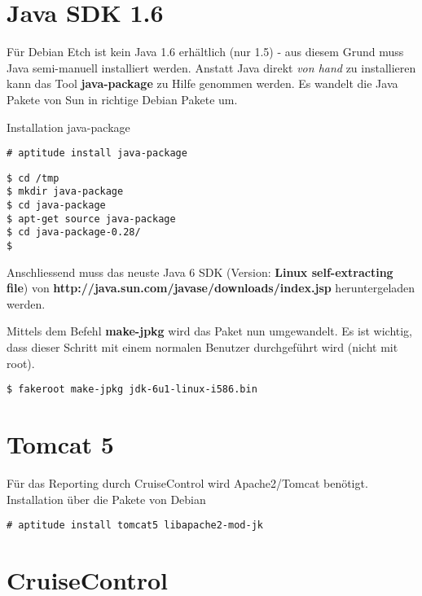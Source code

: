 \documentclass[a4paper,12pt,halfparskip,DIV14]{scrreprt}
\begin{document}

\section{Java SDK 1.6} %
\label{sec:java_sdk}

Für Debian Etch ist kein Java 1.6 erhältlich (nur 1.5) - aus diesem Grund muss Java semi-manuell installiert werden. Anstatt Java direkt \emph{von hand} zu installieren kann das Tool \textbf{java-package} zu Hilfe genommen werden. Es wandelt die Java Pakete von Sun in richtige Debian Pakete um. 

Installation java-package

\begin{verbatim}
# aptitude install java-package  
\end{verbatim}

\begin{verbatim}
$ cd /tmp
$ mkdir java-package
$ cd java-package
$ apt-get source java-package
$ cd java-package-0.28/
$
\end{verbatim}

Anschliessend muss das neuste Java 6 SDK (Version: \textbf{Linux self-extracting file}) von \textbf{http://java.sun.com/javase/downloads/index.jsp} heruntergeladen werden.


Mittels dem Befehl \textbf{make-jpkg} wird das Paket nun umgewandelt. Es ist wichtig, dass dieser Schritt mit einem normalen Benutzer durchgeführt wird (nicht mit root).

\begin{verbatim}
$ fakeroot make-jpkg jdk-6u1-linux-i586.bin 
\end{verbatim}


\section{Tomcat 5} %
\label{sec:tomcat_5}

Für das Reporting durch CruiseControl wird Apache2/Tomcat benötigt. Installation über die Pakete von Debian

\begin{verbatim}
# aptitude install tomcat5 libapache2-mod-jk
\end{verbatim}


\section{CruiseControl} %
\label{sec:cruisecontrol}
\end{document}
